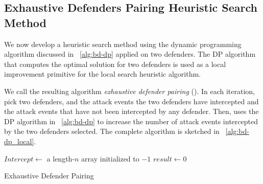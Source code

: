
\subsection{Exhaustive Defenders Pairing Heuristic Search Method}
\label{sec:bd-dp_local}
We now develop a heuristic search method using the dynamic programming algorithm discussed in ~\ref{alg:bd-dp} 
applied on two defenders.
The DP algorithm that computes the optimal solution for two defenders is used as a local improvement primitive 
for the local search heuristic algorithm. 

We call the resulting algorithm \emph{exhaustive defender pairing} (\ours).  
In each iteration, \ours pick two defenders, and the attack events the two defenders have intercepted and the attack events that have not been intercepted by any defender. 
Then, \ours uses the DP algorithm in ~\ref{alg:bd-dp} to increase the number of attack events intercepted by the two defenders selected. 
The complete algorithm is sketched in ~\ref{alg:bd-dp_local}.

\begin{algorithm}[h]
\DontPrintSemicolon
{}

$Intercept \gets$ a length-$n$ array initialized to $-1$\;
$result\gets 0$\;
\vspace{1mm}
\vspace{1mm}
\caption{Exhaustive Defender Pairing}
\label{alg:bd-dp_local}
\end{algorithm}


